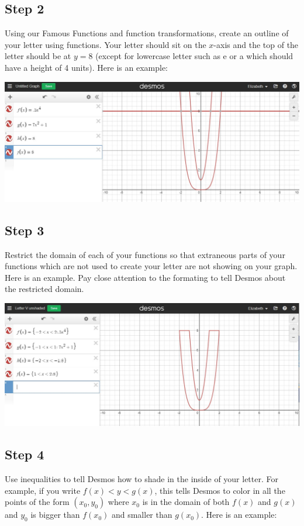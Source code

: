 \documentclass{ximera}
\begin{document}
\subsection{Step 2} Using our Famous Functions and function transformations, create an outline of your letter using functions.  Your letter should sit on the $x$-axis and the top of the letter should be at $y=8$ (except for lowercase letter such as e or a which should have a height of 4 units).  Here is an example:

\begin{image}
\includegraphics{outlinedLetterV.jpg}
\end{image}

\subsection{Step 3} Restrict the domain of each of your functions so that extraneous parts of your functions which are not used to create your letter are not showing on your graph. Here is an example.  Pay close attention to the formating to tell Desmos about the restricted domain. 

\begin{image}
\includegraphics{unshadedLetterV.jpg}
\end{image}

\subsection{Step 4}  Use inequalities to tell Desmos how to shade in the inside of your letter.  For example, if you write $f(x)<y<g(x)$, this tells Desmos to color in all the points of the form $(x_0,y_0)$ where $x_0$ is in the domain of both $f(x)$ and $g(x)$ and $y_0$ is bigger than $f(x_0)$ and smaller than $g(x_0)$.  Here is an example:
\end{document}
